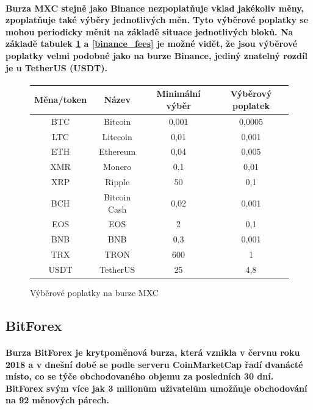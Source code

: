 \documentclass[thesis=B,czech]{FITthesis}[2019/03/21]
\begin{document}
\paragraph{
Burza MXC stejně jako Binance nezpoplatňuje vklad jakékoliv měny, zpoplatňuje také výběry jednotlivých měn. Tyto výběrové poplatky se mohou periodicky měnit na základě situace jednotlivých bloků. \cite{mxc_fees} Na základě tabulek \ref{mxc_fees} a \ref{binance_fees} je možné vidět, že jsou výběrové poplatky velmi podobné jako na burze Binance, jediný znatelný rozdíl je u TetherUS (USDT). \cite{cryptowisser_mxc}
}
\begin{figure}\centering
    \begin{center}
     \begin{tabular}{||c | c | c | c||} 
     \hline
     Měna/token & Název & Minimální výběr & Výběrový poplatek \\ [0.5ex] 
     \hline\hline
     BTC & Bitcoin & 0,001 & 0,0005 \\ 
     \hline
     LTC & Litecoin & 0,01 & 0,001 \\
     \hline
     ETH & Ethereum & 0,04 & 0,005 \\
     \hline
     XMR & Monero & 0,1 & 0,01 \\
     \hline
     XRP & Ripple & 50 & 0,1 \\
     \hline
     BCH & Bitcoin Cash & 0,02 & 0,001 \\
     \hline
     EOS & EOS & 2 & 0,1 \\
     \hline
     BNB & BNB & 0,3 & 0,001 \\
     \hline
     TRX & TRON & 600 & 1 \\
     \hline
     USDT & TetherUS & 25 & 4,8 \\ [1ex] 
     \hline
    \end{tabular}
    \end{center}
    \caption{Výběrové poplatky na burze MXC \cite{mxc_fees}}
    \label{mxc_fees}
\end{figure}
\subsection{BitForex}
\paragraph{
Burza BitForex je krytpoměnová burza, která vznikla v červnu roku 2018 a v dnešní době se podle serveru CoinMarketCap řadí dvanácté místo, co se týče obchodovaného objemu za posledních 30 dní. \cite{coinmarketcap} BitForex svým více jak 3 milionům uživatelům umožňuje obchodování na 92 měnových párech.  \cite{cryptowisser_bitforex}
}
\end{document}
